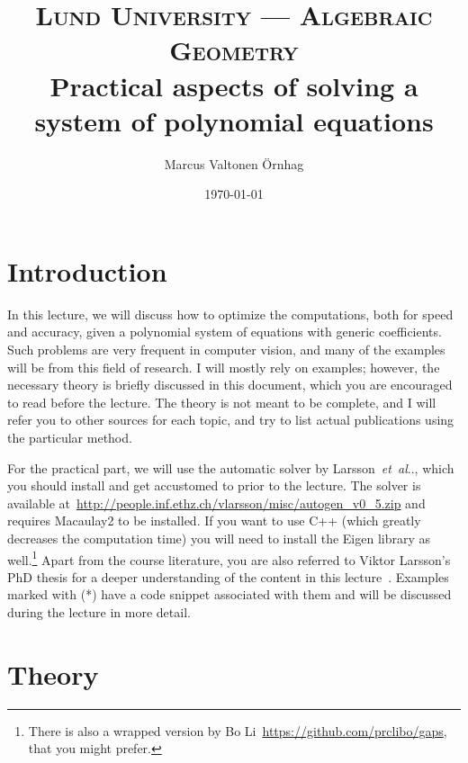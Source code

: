 \documentclass[11pt,a4paper]{article}
\title{
\normalfont \normalsize
\textsc{Lund University --- Algebraic Geometry} \\ [7pt]
\Large Practical aspects of solving a system of polynomial equations \\
}
\author{Marcus Valtonen \"{O}rnhag} %
\date{\normalsize\today} %
\makeatletter
\theoremstyle{definition}
\DeclareRobustCommand\etal{\emph{et~al}\@ifnextchar.{}{.\@}}
\makeatother
\begin{document}
\maketitle %

\section{Introduction}
In this lecture, we will discuss how to optimize the computations, both for speed and
accuracy, given a polynomial system of equations with generic coefficients. Such problems are very
frequent in computer vision, and many of the examples will be from this field of research.
I will mostly rely on examples; however,
the necessary theory is briefly discussed in this document, which you are encouraged to read before
the lecture. The theory is not meant to be complete, and I will refer you to other sources for
each topic, and try to list actual publications using the particular method.

For the practical part, we will use the
automatic solver by Larsson~\etal{}, which you should install and get accustomed to prior
to the lecture. The solver is available at~\url{http://people.inf.ethz.ch/vlarsson/misc/autogen_v0_5.zip} and requires Macaulay2 to be installed. If you want to use C++ (which greatly decreases the computation time) you will need to install the Eigen library as well.\footnote{There is also a wrapped version by Bo Li~\url{https://github.com/prclibo/gaps}, that you might prefer.}
Apart from the course literature, you are also referred to Viktor Larsson's PhD
thesis for a deeper understanding of the content in this lecture~\cite{larsson-phd}.
Examples marked with (*) have a code snippet associated with them and will be discussed during the
lecture in more detail.

\section{Theory}
\end{document}
